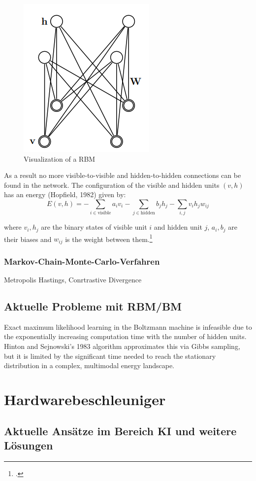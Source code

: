 \begin{figure}[H]
    \centering
    \includegraphics[width=0.25\linewidth]{graphics/RBM_Modell.png}
    \caption{Visualization of a \ac{RBM}}
\end{figure}
As a result no more visible-to-visible and hidden-to-hidden connections can be found in the network.
The configuration of the visible and hidden units \( (v, h) \) has an energy (Hopfield, 1982) given by:
\begin{equation}
E(v, h) = - \sum_{i \in \text{visible}} a_i v_i - \sum_{j \in \text{hidden}} b_j h_j - \sum_{i,j} v_i h_j w_{ij}
\end{equation}

where \( v_i, h_j \) are the binary states of visible unit \( i \) and hidden unit \( j \), \( a_i, b_j \) are their biases and \( w_{ij} \) is the weight between them.\footcite[Vgl.][3-4]{hintonPracticalGuideTraining2012a}


\subsubsection{Markov-Chain-Monte-Carlo-Verfahren}
Metropolis Hastings,
Conrtrastive Divergence

\subsection{Aktuelle Probleme mit RBM/BM}


Exact maximum likelihood learning in the Boltzmann machine is infeasible due to the exponentially increasing computation time with the number of hidden units.
Hinton and Sejnowski's 1983 algorithm approximates this via Gibbs sampling, but it is limited by the significant time needed to reach the stationary distribution in a complex, multimodal energy landscape.

\section{Hardwarebeschleuniger}
\subsection{Aktuelle Ansätze im Bereich KI und weitere Lösungen}

